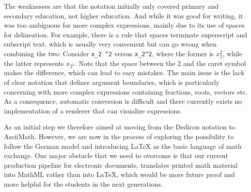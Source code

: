 \documentclass{article}
\begin{document}
The weaknesses are that the notation initially only covered primary and
secondary education, not higher education. And while it was good for writing, it
was too ambiguous for more complex expressions, mainly due to its use of spaces
for delineation. For example, there is a rule that spaces terminate superscript
and subscript text, which is usually very convenient but can go wrong when
combining the two: Consider \verb+x_2 ^2+ versus \verb+x_2^2+, where the former
is $x_2^2$, while the latter represents $x_{2^2}$. Note that the space between the
$2$ and the caret symbol makes the difference, which can lead to easy mistakes.
The main issue is the lack of clear notation that defines argument boundaries,
which is particularly concerning with more complex expressions containing
fractions, roots, vectors etc.  As a consequence, automatic conversion is
difficult and there currently exists no implementation of a renderer that can
visualize expressions.

As an initial step we therefore aimed at moving from the Dedicon notation to
AsciiMath. However, we are now in the process of exploring the possibility to
follow the German model and introducing {\LaTeX} as the basic language of math
exchange.  One major obstacle that we need to overcome is that our current
production pipeline for electronic documents, translates printed math material
into MathML rather than into {\LaTeX}, which would be more future proof and more
helpful for the students in the next generations.



\end{document}
